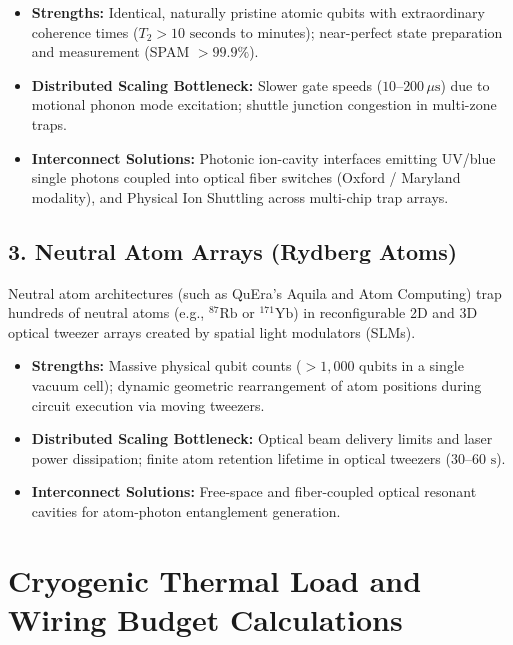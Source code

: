\begin{itemize}
    \item \textbf{Strengths:} Identical, naturally pristine atomic qubits with extraordinary coherence times ($T_2 > 10\text{ seconds}$ to minutes); near-perfect state preparation and measurement (SPAM $> 99.9\%$).
    \item \textbf{Distributed Scaling Bottleneck:} Slower gate speeds ($10\text{--}200\,\mu\text{s}$) due to motional phonon mode excitation; shuttle junction congestion in multi-zone traps.
    \item \textbf{Interconnect Solutions:} Photonic ion-cavity interfaces emitting UV/blue single photons coupled into optical fiber switches (Oxford / Maryland modality), and Physical Ion Shuttling across multi-chip trap arrays.
\end{itemize}

\subsection{3. Neutral Atom Arrays (Rydberg Atoms)}
Neutral atom architectures (such as QuEra's Aquila and Atom Computing) trap hundreds of neutral atoms (e.g., $^{87}\text{Rb}$ or $^{171}\text{Yb}$) in reconfigurable 2D and 3D optical tweezer arrays created by spatial light modulators (SLMs).

\begin{itemize}
    \item \textbf{Strengths:} Massive physical qubit counts ($>1,000\text{ qubits}$ in a single vacuum cell); dynamic geometric rearrangement of atom positions during circuit execution via moving tweezers.
    \item \textbf{Distributed Scaling Bottleneck:} Optical beam delivery limits and laser power dissipation; finite atom retention lifetime in optical tweezers ($30\text{--}60\text{ s}$).
    \item \textbf{Interconnect Solutions:} Free-space and fiber-coupled optical resonant cavities for atom-photon entanglement generation.
\end{itemize}

\section{Cryogenic Thermal Load and Wiring Budget Calculations}
\label{sec:app_cryo_budget}

